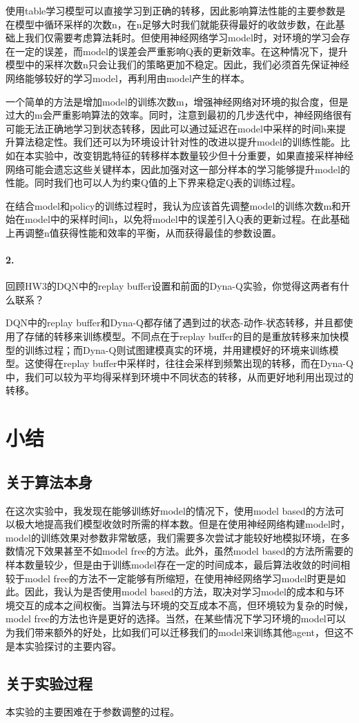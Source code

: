 \documentclass[a4paper,12pt]{article}
\begin{document}
\begin{CJK}{UTF8}{gbsn}
使用table学习模型可以直接学习到正确的转移，因此影响算法性能的主要参数是在模型中循环采样的次数n，在n足够大时我们就能获得最好的收敛步数，在此基础上我们仅需要考虑算法耗时。但使用神经网络学习model时，对环境的学习会存在一定的误差，而model的误差会严重影响Q表的更新效率。在这种情况下，提升模型中的采样次数n只会让我们的策略更加不稳定。因此，我们必须首先保证神经网络能够较好的学习model，再利用由model产生的样本。

一个简单的方法是增加model的训练次数m，增强神经网络对环境的拟合度，但是过大的m会严重影响算法的效率。同时，注意到最初的几步迭代中，神经网络很有可能无法正确地学习到状态转移，因此可以通过延迟在model中采样的时间h来提升算法稳定性。我们还可以为环境设计针对性的改进以提升model的训练性能。比如在本实验中，改变钥匙特征的转移样本数量较少但十分重要，如果直接采样神经网络可能会遗忘这些关键样本，因此加强对这一部分样本的学习能够提升model的性能。同时我们也可以人为约束Q值的上下界来稳定Q表的训练过程。

在结合model和policy的训练过程时，我认为应该首先调整model的训练次数m和开始在model中的采样时间h，以免将model中的误差引入Q表的更新过程。在此基础上再调整n值获得性能和效率的平衡，从而获得最佳的参数设置。

\paragraph{2.}回顾HW3的DQN中的replay buffer设置和前面的Dyna-Q实验，你觉得这两者有什么联系？


DQN中的replay buffer和Dyna-Q都存储了遇到过的状态-动作-状态转移，并且都使用了存储的转移来训练模型。不同点在于replay buffer的目的是重放转移来加快模型的训练过程；而Dyna-Q则试图建模真实的环境，并用建模好的环境来训练模型。这使得在replay buffer中采样时，往往会采样到频繁出现的转移，而在Dyna-Q中，我们可以较为平均得采样到环境中不同状态的转移，从而更好地利用出现过的转移。

\section{小结}
\subsection{关于算法本身}
在这次实验中，我发现在能够训练好model的情况下，使用model based的方法可以极大地提高我们模型收敛时所需的样本数。但是在使用神经网络构建model时，model的训练效果对参数非常敏感，我们需要多次尝试才能较好地模拟环境，在多数情况下效果甚至不如model free的方法。此外，虽然model based的方法所需要的样本数量较少，但是由于训练model存在一定的时间成本，最后算法收敛的时间相较于model free的方法不一定能够有所缩短，在使用神经网络学习model时更是如此。因此，我认为是否使用model based的方法，取决对学习model的成本和与环境交互的成本之间权衡。当算法与环境的交互成本不高，但环境较为复杂的时候，model free的方法也许是更好的选择。当然，在某些情况下学习环境的model可以为我们带来额外的好处，比如我们可以迁移我们的model来训练其他agent，但这不是本实验探讨的主要内容。
\subsection{关于实验过程}
本实验的主要困难在于参数调整的过程。

\end{CJK}
\end{document}
